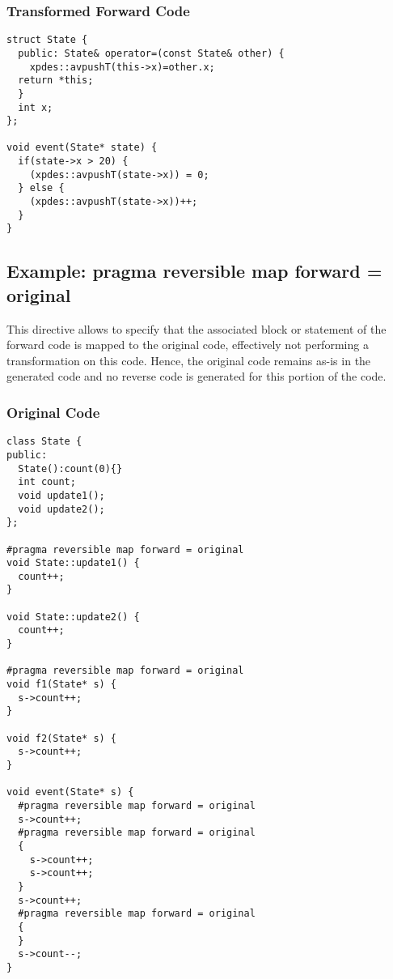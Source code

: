 \documentclass[english,12pt, titlepage]{article}      %
\begin{document}
\subsubsection{Transformed Forward Code}

{\footnotesize
\begin{verbatim}
struct State {
  public: State& operator=(const State& other) {
    xpdes::avpushT(this->x)=other.x;
  return *this;
  }
  int x;
};

void event(State* state) {           
  if(state->x > 20) {
    (xpdes::avpushT(state->x)) = 0;
  } else {
    (xpdes::avpushT(state->x))++;
  }
}
\end{verbatim}
}

\subsection{Example: pragma reversible map forward = original}
\label{exclude-example}

This directive allows to specify that the associated block or
statement of the forward code is mapped to the original code,
effectively not performing a transformation on this code. Hence, the
original code remains as-is in the generated code and no reverse code
is generated for this portion of the code.

\subsubsection{Original Code}
{
\footnotesize
\begin{verbatim}
class State {
public:
  State():count(0){}
  int count;
  void update1();
  void update2();
};

#pragma reversible map forward = original
void State::update1() {
  count++;
}

void State::update2() {
  count++;
}

#pragma reversible map forward = original
void f1(State* s) {
  s->count++;
}

void f2(State* s) {
  s->count++;
}

void event(State* s) {
  #pragma reversible map forward = original
  s->count++;
  #pragma reversible map forward = original
  {
    s->count++;
    s->count++;
  }
  s->count++;
  #pragma reversible map forward = original
  {
  }
  s->count--;
}
\end{verbatim}
}
\end{document}
